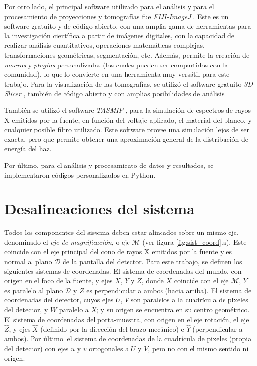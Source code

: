 Por otro lado, el principal software utilizado para el análisis y para el procesamiento de
proyecciones y tomografías fue \textit{FIJI-ImageJ} \cite{FIJI}\cite{FIJI2}. Este es un software gratuito
y de código abierto, con una amplia gama de herramientas para la investigación científica
a partir de imágenes digitales, con la capacidad de realizar análisis cuantitativos, operaciones
matemáticas complejas, transformaciones geométricas, segmentación, etc. Además, permite la
creación de \textit{macros} y \textit{plugins} personalizados (los cuales pueden ser compartidos con la comunidad),
lo que lo convierte en una herramienta muy versátil para este trabajo. Para la visualización de las tomografías, se utilizó el software gratuito \textit{3D Slicer} \cite{3DSlicer1}
\cite{3DSlicer2}, también de código abierto y con amplias posibilidades de análisis.

También se utilizó el software \textit{TASMIP} \cite{TASMIP}, para la simulación de espectros
de rayos X emitidos por la fuente, en función del voltaje aplicado, el material del blanco, y
cualquier posible filtro utilizado. Este software provee una simulación lejos de ser exacta,
pero que permite obtener una aproximación general de la distribución de energía del haz.

Por último, para el análisis y procesamiento de datos y resultados, se implementaron códigos
personalizados en Python.

\section{Desalineaciones del sistema}

Todos los componentes del sistema deben estar alineados sobre un mismo eje, denominado el \textit{eje
de magnificación}, o eje $\mathcal{M}$ (ver figura \ref{fig:sist_coord}.a). Este coincide con el eje
principal del cono de rayos X emitidos por la fuente y es normal al plano $\mathcal{D}$ de la
pantalla del detector. Para este trabajo, se definen los siguientes sistemas de
coordenadas. El sistema de coordenadas del mundo, con origen en el foco de la fuente, y ejes $X$, $Y$ y $Z$,
donde $X$ coincide con el eje $\mathcal{M}$, $Y$ es paralelo al plano $\mathcal{D}$ y $Z$
es perpendicular a ambos (hacia arriba). El sistema de coordenadas del detector, cuyos ejes $U$, $V$
son paralelos a la cuadrícula de pixeles del detector, y $W$ paralelo a $X$; y su origen se encuentra en su centro geométrico.
El sistema de coordenadas del porta-muestra, con origen en el eje rotación, el eje $\hat{Z}$, y ejes
$\hat{X}$ (definido por la dirección del brazo mecánico) e $\hat{Y}$ (perpendicular a ambos).
Por último, el sistema de coordenadas de la cuadrícula de pixeles (propia del detector) con ejes $u$ y $v$
ortogonales a $U$ y $V$, pero no con el mismo sentido ni origen.

